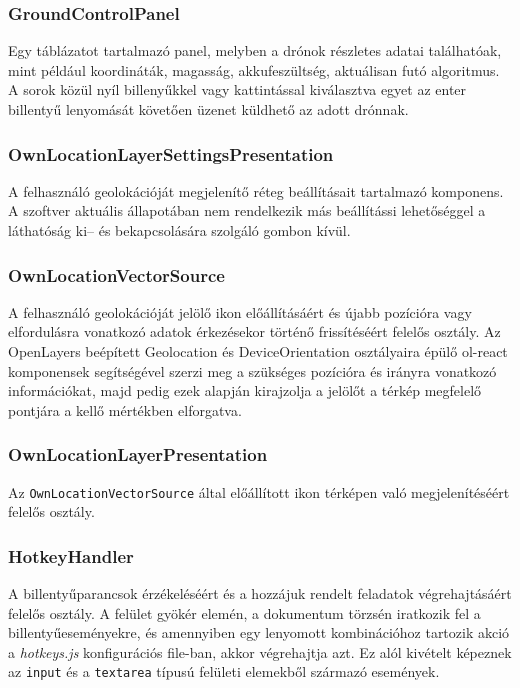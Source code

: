 \subsubsection{GroundControlPanel}

Egy táblázatot tartalmazó panel, melyben a drónok részletes adatai találhatóak,
mint például koordináták, magasság, akkufeszültség, aktuálisan futó algoritmus.
A sorok közül nyíl billenyűkkel vagy kattintással kiválasztva egyet az enter
billentyű lenyomását követően üzenet küldhető az adott drónnak.

\subsubsection{OwnLocationLayerSettingsPresentation}

A felhasználó geolokációját megjelenítő réteg beállításait tartalmazó komponens.
A szoftver aktuális állapotában nem rendelkezik más beállítássi lehetőséggel a
láthatóság ki-- és bekapcsolására szolgáló gombon kívül.

\subsubsection{OwnLocationVectorSource}

A felhasználó geolokációját jelölő ikon előállításáért és újabb pozícióra vagy
elfordulásra vonatkozó adatok érkezésekor történő frissítéséért felelős osztály.
Az OpenLayers beépített Geolocation és DeviceOrientation osztályaira épülő
ol-react komponensek segítségével szerzi meg a szükséges pozícióra és irányra
vonatkozó információkat, majd pedig ezek alapján kirajzolja a jelölőt a térkép
megfelelő pontjára a kellő mértékben elforgatva.

\subsubsection{OwnLocationLayerPresentation}

Az \verb|OwnLocationVectorSource| által előállított ikon térképen való
megjelenítéséért felelős osztály.

\subsubsection{HotkeyHandler}

A billentyűparancsok érzékeléséért és a hozzájuk rendelt feladatok
végrehajtásáért felelős osztály. A felület gyökér elemén, a dokumentum törzsén
iratkozik fel a billentyűeseményekre, és amennyiben egy lenyomott kombinációhoz
tartozik akció a \textit{hotkeys.js} konfigurációs file-ban, akkor végrehajtja
azt. Ez alól kivételt képeznek az \verb|input| és a \verb|textarea| típusú
felületi elemekből származó események.

